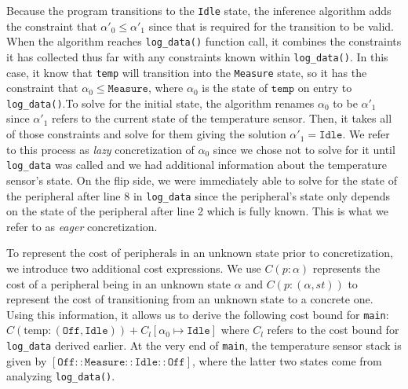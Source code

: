 Because the program transitions to the \texttt{Idle} state, the inference algorithm adds the constraint that $\alpha'_0 \leq \alpha'_1$ since that is required for the transition to be valid. When the algorithm reaches \texttt{log\_data()} function call, it combines the constraints it has collected thus far with any constraints known within \texttt{log\_data()}. In this case, it know that \texttt{temp} will transition into the \texttt{Measure} state, so it has the constraint that $\alpha_0 \leq \texttt{Measure}$, where $\alpha_0$ is the state of $\texttt{temp}$ on entry to \texttt{log\_data()}.To solve for the initial state, the algorithm renames $\alpha_0$ to be $\alpha'_1$ since $\alpha'_1$ refers to the current state of the temperature sensor. Then, it takes all of those constraints and solve for them giving the solution $\alpha'_1 = \texttt{Idle}$. We refer to this process as \textit{lazy} concretization of $\alpha_0$ since we chose not to solve for it until \texttt{log\_data} was called and we had additional information about the temperature sensor's state. On the flip side, we were immediately able to solve for the state of the peripheral after line 8 in \texttt{log\_data} since the peripheral's state only depends on the state of the peripheral after line 2 which is fully known. This is what we refer to as \textit{eager} concretization.

To represent the cost of peripherals in an unknown state prior to concretization, we introduce two additional cost expressions. We use $C(p : \alpha)$ represents the cost of a peripheral being in an unknown state $\alpha$ and $C(p : (\alpha, st))$ to represent the cost of transitioning from an unknown state to a concrete one. Using this information, it allows us to derive the following cost bound for \texttt{main}: $C(\text{temp}: (\texttt{Off}, \texttt{Idle})) + C_l[\alpha_0 \mapsto \texttt{Idle}]$ where $C_l$ refers to the cost bound for \texttt{log\_data} derived earlier. At the very end of \texttt{main}, the temperature sensor stack is given by $[\texttt{Off} :: \texttt{Measure} :: \texttt{Idle} :: \texttt{Off}]$, where the latter two states come from analyzing \texttt{log\_data()}.

